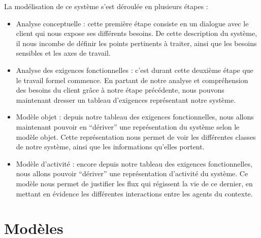 \documentclass[12pt,a4paper]{article}
\begin{document}
La modélisation de ce système s'est déroulée en plusieurs étapes :
\begin{itemize}
        \item Analyse conceptuelle : cette première étape consiste en un
            dialogue avec le client qui nous expose ses différents besoins. De
            cette description du système, il nous incombe de définir les points
            pertinents à traiter, ainsi que les besoins sensibles et les axes de
            travail.
        \item Analyse des exigences fonctionnelles : c'est durant cette deuxième
            étape que le travail formel commence. En partant de notre
            analyse et compréhension des besoins du client grâce à notre étape
            précédente, nous pouvons maintenant dresser un tableau d'exigences
            représentant notre système.
        \item Modèle objet : depuis notre tableau des exigences fonctionnelles,
            nous allons maintenant pouvoir en \enquote{dériver} une
            représentation du système selon le modèle objet. Cette
            représentation nous permet de voir les différentes classes de
            notre système, ainsi que les informations qu'elles portent.
        \item Modèle d'activité : encore depuis notre tableau des exigences
            fonctionnelles, nous allons pouvoir \enquote{dériver} une
            représentation d'activité du système. Ce modèle nous permet de
            justifier les flux qui régissent la vie de ce dernier, en mettant en
            évidence les différentes interactions entre les agents du contexte.
\end{itemize}

\section{Modèles}
\end{document}
